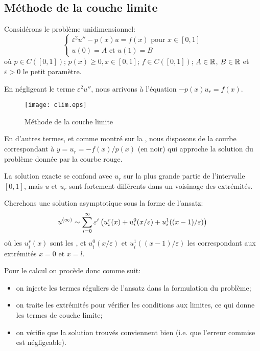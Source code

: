 \medskip
\subsection{Méthode de la couche limite}

Considérons le problème unidimensionnel:
\begin{equation}
\left\{
\begin{array}{l}
\varepsilon^2u''-p(x)u= f(x) \text{ pour } x\in[0,1]\\
u(0)=A \text{ et } u(1)=B
\end{array}
\right.
\end{equation}
où $p\in C([0,1])$; $p(x)\ge0, x\in[0,1]$; $f\in C([0,1])$; $A\in\mathbb R$, $B\in\mathbb R$ et
$\varepsilon>0$ le petit paramètre.

En négligeant le terme $\varepsilon^2 u''$, nous arrivons à l'équation $-p(x)u_r=f(x)$.

\begin{figure}[htb]
\centerline{\texttt{[image: clim.eps]}}
\caption{Méthode de la couche limite}\label{Fig-clim}
\end{figure}
En d'autres termes, et comme montré sur la , nous disposons de la
courbe correspondant à $y=u_r=-f(x)/p(x)$ (en noir) qui approche la solution du problème donnée par la courbe rouge.

La solution exacte se confond avec $u_r$ sur la plus grande partie de l'intervalle $[0,1]$,
mais $u$ et $u_r$ sont fortement différents dans un voisinage des extrémités.

\medskip
Cherchons une solution asymptotique sous la forme de l'ansatz:
\begin{equation}
u^{(\infty)} \sim \displaystyle\sum_{i=0}^\infty \varepsilon^i\left( u_i^r(x) + u_i^0(x/\varepsilon)
+u_i^1((x-1)/\varepsilon) \right)
\end{equation}
où les $u_i^r(x)$ sont les , et $u_i^0(x/\varepsilon)$ et 
$u_i^1((x-1)/\varepsilon)$ les  correspondant aux
extrémités $x=0$ et $x=l$.

\medskip
Pour le calcul on procède donc comme suit:
\begin{itemize}
   \item on injecte les termes réguliers de l'ansatz dans la formulation du problème;
   \item on traite les extrémités pour vérifier les conditions aux limites, ce qui donne les termes de couche
	limite;
   \item on vérifie que la solution trouvés conviennent bien (i.e. que l'erreur commise est négligeable).
\end{itemize}


